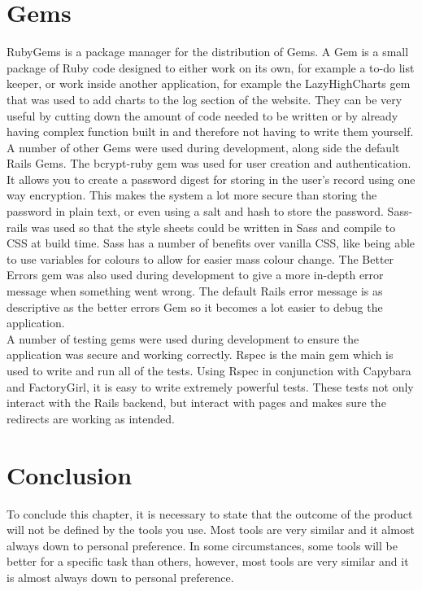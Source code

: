 \section{Gems}
RubyGems \citep{rubygems:2009} is a package manager for the distribution of Gems. A Gem is a small package of Ruby code designed to either work on its own, for example a to-do list keeper, or work inside another application, for example the LazyHighCharts gem that was used to add charts to the log section of the website. They can be very useful by cutting down the amount of code needed to be written or by already having complex function built in and therefore not having to write them yourself. A number of other Gems were used during development, along side the default Rails Gems. The bcrypt-ruby gem was used for user creation and authentication. It allows you to create a password digest for storing in the user's record using one way encryption. This makes the system a lot more secure than storing the password in plain text, or even using a salt and hash to store the password. Sass-rails was used so that the style sheets could be written in Sass and compile to CSS at build time. Sass has a number of benefits over vanilla CSS, like being able to use variables for colours to allow for easier mass colour change. The Better Errors gem was also used during development to give a more in-depth error message when something went wrong. The default Rails error message is as descriptive as the better errors Gem so it becomes a lot easier to debug the application.\\

A number of testing gems were used during development to ensure the application was secure and working correctly. Rspec is the main gem which is used to write and run all of the tests. Using Rspec in conjunction with Capybara and FactoryGirl, it is easy to write extremely powerful tests. These tests not only interact with the Rails backend, but interact with pages and makes sure the redirects are working as intended.

\section{Conclusion}
To conclude this chapter, it is necessary to state that the outcome of the product will not be defined by the tools you use. Most tools are very similar and it almost always down to personal preference. In some circumstances, some tools will be better for a specific task than others, however, most tools are very similar and it is almost always down to personal preference.